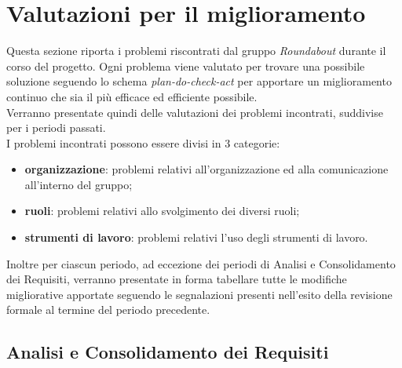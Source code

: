 \section{Valutazioni per il miglioramento}
	Questa sezione riporta i problemi riscontrati dal gruppo \textit{Roundabout} durante il corso del progetto. Ogni problema viene valutato per trovare una possibile soluzione seguendo lo schema \textit{plan-do-check-act} per apportare un miglioramento continuo che sia il più efficace ed efficiente possibile. \\
	Verranno presentate quindi delle valutazioni dei problemi incontrati, suddivise per i periodi passati. \\
		I problemi incontrati possono essere divisi in 3 categorie:
		\begin{itemize}
			\item \textbf{organizzazione}: problemi relativi all'organizzazione ed alla comunicazione all'interno del gruppo;
			\item \textbf{ruoli}: problemi relativi allo svolgimento dei diversi ruoli;
			\item \textbf{strumenti di lavoro}: problemi relativi l'uso degli strumenti di lavoro.
		\end{itemize}
	Inoltre per ciascun periodo, ad eccezione dei periodi di Analisi e Consolidamento dei Requisiti, verranno presentate in forma tabellare tutte le modifiche migliorative apportate seguendo le segnalazioni presenti nell'esito della revisione formale al termine del periodo precedente.
	

	\subsection{Analisi e Consolidamento dei Requisiti}
	
